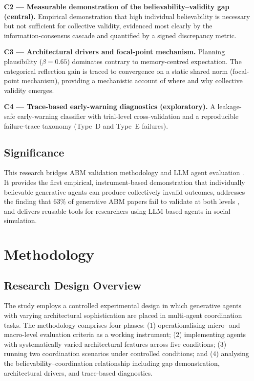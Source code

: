 \documentclass[11pt]{article}
\begin{document}
\textbf{C2 --- Measurable demonstration of the believability--validity gap (central).} Empirical demonstration that high individual believability is necessary but not sufficient for collective validity, evidenced most clearly by the information-consensus cascade and quantified by a signed discrepancy metric.

\textbf{C3 --- Architectural drivers and focal-point mechanism.} Planning plausibility ($\beta = 0.65$) dominates contrary to memory-centred expectation. The categorical reflection gain is traced to convergence on a static shared norm (focal-point mechanism), providing a mechanistic account of where and why collective validity emerges.

\textbf{C4 --- Trace-based early-warning diagnostics (exploratory).} A leakage-safe early-warning classifier with trial-level cross-validation and a reproducible failure-trace taxonomy (Type~D and Type~E failures).

\subsection{Significance}
This research bridges ABM validation methodology \cite{windrum2007empirical, moss2005towards} and LLM agent evaluation \cite{li2024agentbench, mohammadi2025evaluation}. It provides the first empirical, instrument-based demonstration that individually believable generative agents can produce collectively invalid outcomes, addresses the finding that 63\% of generative ABM papers fail to validate at both levels \cite{larooij2025critical}, and delivers reusable tools for researchers using LLM-based agents in social simulation.

\section{Methodology}

\subsection{Research Design Overview}
The study employs a controlled experimental design in which generative agents with varying architectural sophistication are placed in multi-agent coordination tasks. The methodology comprises four phases: (1) operationalising micro- and macro-level evaluation criteria as a working instrument; (2) implementing agents with systematically varied architectural features across five conditions; (3) running two coordination scenarios under controlled conditions; and (4) analysing the believability--coordination relationship including gap demonstration, architectural drivers, and trace-based diagnostics.
\end{document}
